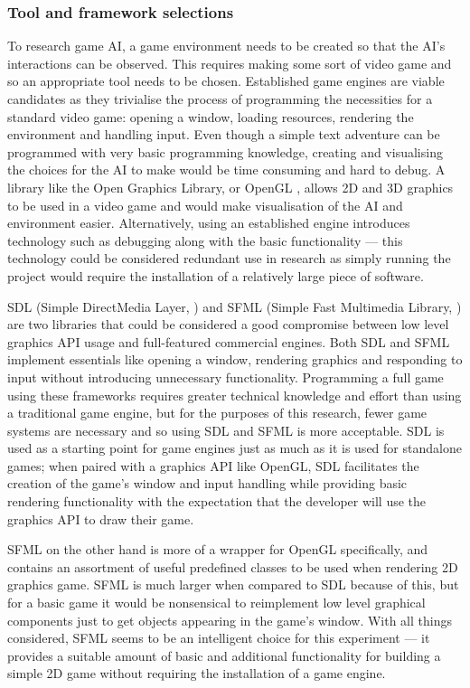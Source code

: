 \documentclass[11pt, a4paper]{article}
\begin{document}
\subsubsection{Tool and framework selections}

To research game AI, a game environment needs to be created so that the AI's interactions can be observed. This requires making some sort of video game and so an appropriate tool needs to be chosen. Established game engines are viable candidates as they trivialise the process of programming the necessities for a standard video game: opening a window, loading resources, rendering the environment and handling input. Even though a simple text adventure can be programmed with very basic programming knowledge, creating and visualising the choices for the AI to make would be time consuming and hard to debug. A library like the Open Graphics Library, or OpenGL \parencite{OpenGL}, allows 2D and 3D graphics to be used in a video game and would make visualisation of the AI and environment easier. Alternatively, using an established engine introduces technology such as debugging along with the basic functionality --- this technology could be considered redundant use in research as simply running the project would require the installation of a relatively large piece of software.

SDL (Simple DirectMedia Layer, \cite{SDL}) and SFML (Simple Fast Multimedia Library, \cite{SFML}) are two libraries that could be considered a good compromise between low level graphics API usage and full-featured commercial engines. Both SDL and SFML implement essentials like opening a window, rendering graphics and responding to input without introducing unnecessary functionality. Programming a full game using these frameworks requires greater technical knowledge and effort than using a traditional game engine, but for the purposes of this research, fewer game systems are necessary and so using SDL and SFML is more acceptable. SDL is used as a starting point for game engines just as much as it is used for standalone games; when paired with a graphics API like OpenGL, SDL facilitates the creation of the game's window and input handling while providing basic rendering functionality with the expectation that the developer will use the graphics API to draw their game. 

SFML on the other hand is more of a wrapper for OpenGL specifically, and contains an assortment of useful predefined classes to be used when rendering 2D graphics game. SFML is much larger when compared to SDL because of this, but for a basic game it would be nonsensical to reimplement low level graphical components just to get objects appearing in the game's window. With all things considered, SFML seems to be an intelligent choice for this experiment --- it provides a suitable amount of basic and additional functionality for building a simple 2D game without requiring the installation of a game engine.
\end{document}
